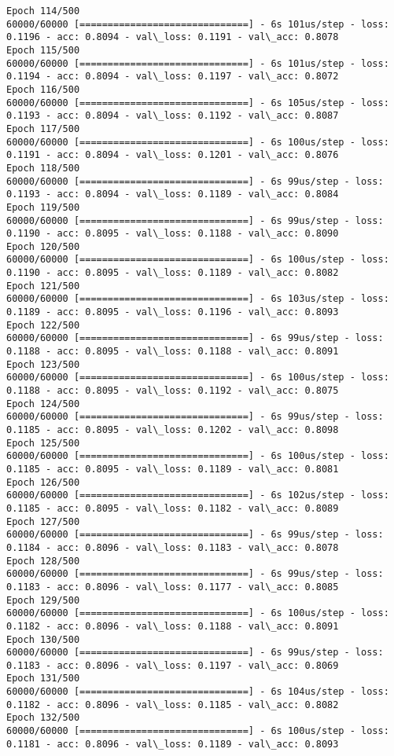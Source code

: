 \documentclass[11pt]{article}
\begin{document}
\begin{Verbatim}[commandchars=\\\{\}]
Epoch 114/500
60000/60000 [==============================] - 6s 101us/step - loss: 0.1196 - acc: 0.8094 - val\_loss: 0.1191 - val\_acc: 0.8078
Epoch 115/500
60000/60000 [==============================] - 6s 101us/step - loss: 0.1194 - acc: 0.8094 - val\_loss: 0.1197 - val\_acc: 0.8072
Epoch 116/500
60000/60000 [==============================] - 6s 105us/step - loss: 0.1193 - acc: 0.8094 - val\_loss: 0.1192 - val\_acc: 0.8087
Epoch 117/500
60000/60000 [==============================] - 6s 100us/step - loss: 0.1191 - acc: 0.8094 - val\_loss: 0.1201 - val\_acc: 0.8076
Epoch 118/500
60000/60000 [==============================] - 6s 99us/step - loss: 0.1193 - acc: 0.8094 - val\_loss: 0.1189 - val\_acc: 0.8084
Epoch 119/500
60000/60000 [==============================] - 6s 99us/step - loss: 0.1190 - acc: 0.8095 - val\_loss: 0.1188 - val\_acc: 0.8090
Epoch 120/500
60000/60000 [==============================] - 6s 100us/step - loss: 0.1190 - acc: 0.8095 - val\_loss: 0.1189 - val\_acc: 0.8082
Epoch 121/500
60000/60000 [==============================] - 6s 103us/step - loss: 0.1189 - acc: 0.8095 - val\_loss: 0.1196 - val\_acc: 0.8093
Epoch 122/500
60000/60000 [==============================] - 6s 99us/step - loss: 0.1188 - acc: 0.8095 - val\_loss: 0.1188 - val\_acc: 0.8091
Epoch 123/500
60000/60000 [==============================] - 6s 100us/step - loss: 0.1188 - acc: 0.8095 - val\_loss: 0.1192 - val\_acc: 0.8075
Epoch 124/500
60000/60000 [==============================] - 6s 99us/step - loss: 0.1185 - acc: 0.8095 - val\_loss: 0.1202 - val\_acc: 0.8098
Epoch 125/500
60000/60000 [==============================] - 6s 100us/step - loss: 0.1185 - acc: 0.8095 - val\_loss: 0.1189 - val\_acc: 0.8081
Epoch 126/500
60000/60000 [==============================] - 6s 102us/step - loss: 0.1185 - acc: 0.8095 - val\_loss: 0.1182 - val\_acc: 0.8089
Epoch 127/500
60000/60000 [==============================] - 6s 99us/step - loss: 0.1184 - acc: 0.8096 - val\_loss: 0.1183 - val\_acc: 0.8078
Epoch 128/500
60000/60000 [==============================] - 6s 99us/step - loss: 0.1183 - acc: 0.8096 - val\_loss: 0.1177 - val\_acc: 0.8085
Epoch 129/500
60000/60000 [==============================] - 6s 100us/step - loss: 0.1182 - acc: 0.8096 - val\_loss: 0.1188 - val\_acc: 0.8091
Epoch 130/500
60000/60000 [==============================] - 6s 99us/step - loss: 0.1183 - acc: 0.8096 - val\_loss: 0.1197 - val\_acc: 0.8069
Epoch 131/500
60000/60000 [==============================] - 6s 104us/step - loss: 0.1182 - acc: 0.8096 - val\_loss: 0.1185 - val\_acc: 0.8082
Epoch 132/500
60000/60000 [==============================] - 6s 100us/step - loss: 0.1181 - acc: 0.8096 - val\_loss: 0.1189 - val\_acc: 0.8093

\end{Verbatim}
\end{document}
